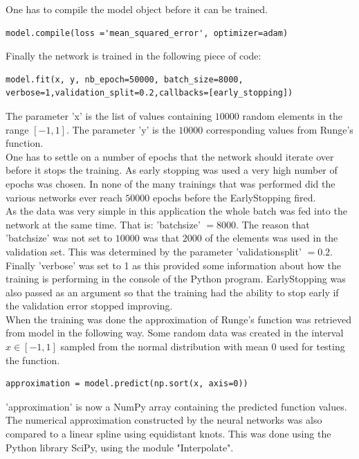 \documentclass[11pt, letterpaper]{amsart}
\begin{document}
One has to compile the model object before it can be trained.
\begin{lstlisting}
model.compile(loss ='mean_squared_error', optimizer=adam)
\end{lstlisting}
Finally the network is trained in the following piece of code:
\begin{lstlisting}
model.fit(x, y, nb_epoch=50000, batch_size=8000, verbose=1,validation_split=0.2,callbacks=[early_stopping])
\end{lstlisting}
The parameter 'x' is the list of values containing $10000$ random elements in the range $[-1,1]$. The parameter 'y' is the $10000$ corresponding values from Runge's function.
\\

One has to settle on a number of epochs that the network should iterate over before it stops the training. As early stopping was used a very high number of epochs was chosen. In none of the many trainings that was performed did the various networks ever reach $50000$ epochs before the EarlyStopping fired.
\\

As the data was very simple in this application the whole batch was fed into the network at the same time. That is: 'batchsize' $= 8000$. The reason that 'batchsize' was not set to $10000$ was that $2000$ of the elements was used in the validation set. This was determined by the parameter 'validationsplit' $=0.2$.
\\

Finally 'verbose' was set to 1 as this provided some information about how the training is performing in the console of the Python program. EarlyStopping was also passed as an argument so that the training had the ability to stop early if the validation error stopped improving.
\\

When the training was done the approximation of Runge's function was retrieved from model in the following way. Some random data was created in the interval $x\in[-1,1]$ sampled from the normal distribution with mean $0$ used for testing the function.
\begin{lstlisting}
approximation = model.predict(np.sort(x, axis=0))
\end{lstlisting}
'approximation' is now a NumPy array containing the predicted function values.
\\

The numerical approximation constructed by the neural networks was also compared to a linear spline using equidistant knots. This was done using the Python library SciPy, using the module "Interpolate".
\\
\end{document}
